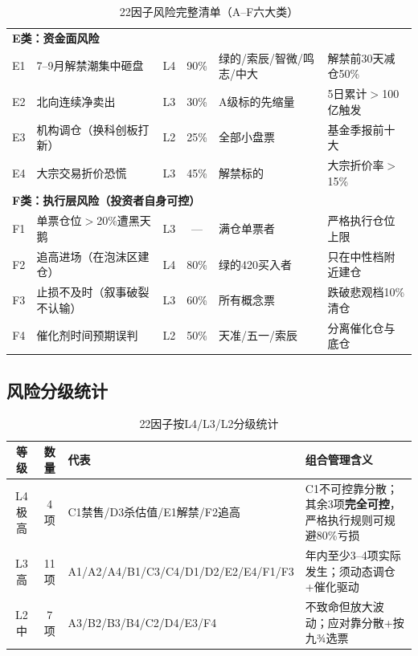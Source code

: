 \begin{table}[H]
\begin{tabularx}{\textwidth}{c l c c X X}
\midrule
\multicolumn{6}{l}{\textbf{E类：资金面风险}} \\
E1 & 7--9月解禁潮集中砸盘 & \textcolor{riskred}{L4} & 90\% & 绿的/索辰/智微/鸣志/中大 & 解禁前30天减仓50\% \\
E2 & 北向连续净卖出 & L3 & 30\% & A级标的先缩量 & 5日累计$>$100亿触发 \\
E3 & 机构调仓（换科创板打新） & L2 & 25\% & 全部小盘票 & 基金季报前十大 \\
E4 & 大宗交易折价恐慌 & L3 & 45\% & 解禁标的 & 大宗折价率$>$15\% \\
\midrule
\multicolumn{6}{l}{\textbf{F类：执行层风险（投资者自身可控）}} \\
F1 & 单票仓位$>$20\%遭黑天鹅 & L3 & — & 满仓单票者 & 严格执行仓位上限 \\
F2 & 追高进场（在泡沫区建仓） & \textcolor{riskred}{L4} & 80\% & 绿的420买入者 & 只在中性档附近建仓 \\
F3 & 止损不及时（叙事破裂不认输） & L3 & 60\% & 所有概念票 & 跌破悲观档10\%清仓 \\
F4 & 催化剂时间预期误判 & L2 & 50\% & 天准/五一/索辰 & 分离催化仓与底仓 \\
\bottomrule
\end{tabularx}
\caption{22因子风险完整清单（A--F六大类）}
\end{table}

\subsection{风险分级统计}

\begin{table}[H]
\centering\small
\renewcommand{\arraystretch}{1.2}
\begin{tabularx}{\textwidth}{c c X X}
\toprule
\textbf{等级} & \textbf{数量} & \textbf{代表} & \textbf{组合管理含义} \\
\midrule
\textcolor{riskred}{L4 极高} & 4项 & C1禁售/D3杀估值/E1解禁/F2追高 & C1不可控靠分散；其余3项\textbf{完全可控}，严格执行规则可规避80\%亏损 \\
\textcolor{riskamber}{L3 高} & 11项 & A1/A2/A4/B1/C3/C4/D1/D2/E2/E4/F1/F3 & 年内至少3--4项实际发生；须动态调仓+催化驱动 \\
L2 中 & 7项 & A3/B2/B3/B4/C2/D4/E3/F4 & 不致命但放大波动；应对靠分散+按九¾选票 \\
\bottomrule
\end{tabularx}
\caption{22因子按L4/L3/L2分级统计}
\end{table}

